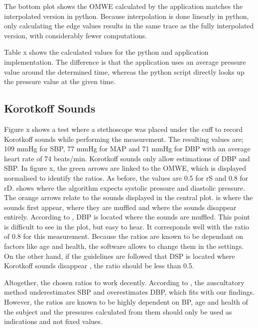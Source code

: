 The bottom plot shows the OMWE calculated by the application matches the interpolated version in python. Because interpolation is done linearly in python, only calculating the edge values results in the same trace as the fully interpolated version, with considerably fewer computations.

Table x shows the calculated values for the python and application implementation. The difference is that the application uses an average pressure value around the determined time, whereas the python script directly looks up the pressure value at the given time. 


\subsection{Korotkoff Sounds}\label{sec:koro}

Figure x shows a test where a stethoscope was placed under the cuff to record Korotkoff sounds while performing the measurement. The resulting values are; 109 mmHg for SBP, 77 mmHg for MAP and 71 mmHg for DBP with an average heart rate of 74 beats/min. Korotkoff sounds only allow estimations of DBP and SBP. In figure x, the green arrows are linked to the OMWE, which is displayed normalised to identify the ratios. As before, the values are 0.5 for rS and 0.8 for rD.  shows where the algorithm expects systolic pressure and  diastolic pressure. The orange arrows relate to the sounds displayed in the central plot.  is where the sounds first appear,  where they are muffled and  where the sounds disappear entirely. According to \cite{Boron2012}, DBP is located where the sounds are muffled. This point is difficult to see in the plot, but easy to hear. It corresponds well with the ratio of 0.8 for this measurement.
Because the ratios are known to be dependant on factors like age and health, the software allows to change them in the settings.  On the other hand, if the guidelines are followed that DSP is located where Korotkoff sounds disappear \citep{Lloyd2018,Reeves1995}, the ratio should be less than 0.5. 

Altogether, the chosen ratios to work decently. According to \citet{Sapinski1996}, the auscultatory method underestimates SBP and overestimates DBP, which fits with our findings. However, the ratios are known to be highly dependent on BP, age and health of the subject and the pressures calculated from them should only be used as indications and not fixed values. 

